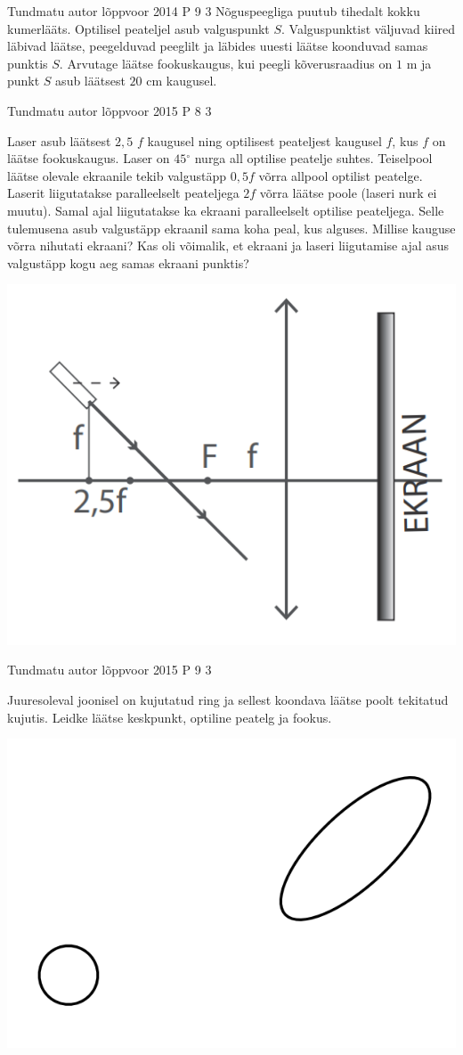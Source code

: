 \documentclass[11pt]{article}
\begin{document}
{%
{Tundmatu autor} %
{lõppvoor} %
{2014} %
{P 9} %
{3} %
{
\ifStatement
Nõguspeegliga puutub tihedalt kokku kumerlääts. Optilisel peateljel asub valguspunkt $S$. Valguspunktist väljuvad kiired läbivad läätse, peegelduvad peeglilt ja läbides uuesti läätse koonduvad samas punktis $S$. Arvutage läätse fookuskaugus, kui peegli kõverusraadius on $1$ m ja punkt $S$ asub läätsest $20$ cm kaugusel.
\fi
}

{Tundmatu autor} %
{lõppvoor} %
{2015} %
{P 8} %
{3} %
{
\ifStatement
Laser asub läätsest $2,5$ $f$ kaugusel ning optilisest peateljest kaugusel $f$, kus $f$ on läätse fookuskaugus. Laser on $45$$^{\circ}$ nurga all optilise peatelje suhtes. Teiselpool läätse olevale ekraanile tekib valgustäpp $0,5f$ võrra allpool optilist peatelge. Laserit liigutatakse paralleelselt peateljega $2f$ võrra läätse poole (laseri nurk ei muutu). Samal ajal liigutatakse ka ekraani paralleelselt optilise peateljega. Selle tulemusena asub valgustäpp ekraanil sama koha peal, kus alguses. Millise kauguse võrra nihutati ekraani? Kas oli võimalik, et ekraani ja laseri liigutamise ajal asus valgustäpp kogu aeg samas ekraani punktis?
\begin{center}
	\includegraphics[width=0.5\linewidth]{2015-v3p-08-yl.PNG}
\end{center}
\fi
}

{Tundmatu autor} %
{lõppvoor} %
{2015} %
{P 9} %
{3} %
{
\ifStatement
Juuresoleval joonisel on kujutatud ring ja sellest koondava läätse poolt tekitatud kujutis. Leidke läätse keskpunkt, optiline peatelg ja fookus.
\begin{center}
	\includegraphics[width=0.5\linewidth]{2015-v3p-09-yl.PNG}
\end{center}
\fi
}


}
\end{document}

